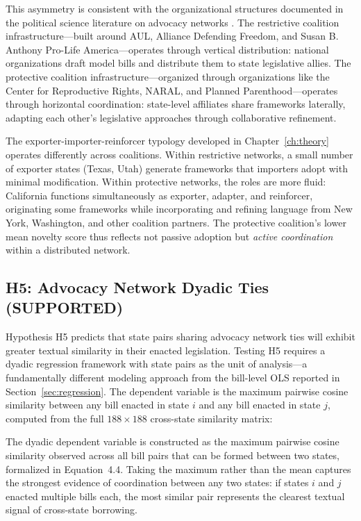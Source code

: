 This asymmetry is consistent with the organizational structures documented in the political science literature on advocacy networks \parencite{hertel-fernandezStateCapture2019}. The restrictive coalition infrastructure---built around AUL, Alliance Defending Freedom, and Susan B. Anthony Pro-Life America---operates through vertical distribution: national organizations draft model bills and distribute them to state legislative allies. The protective coalition infrastructure---organized through organizations like the Center for Reproductive Rights, NARAL, and Planned Parenthood---operates through horizontal coordination: state-level affiliates share frameworks laterally, adapting each other's legislative approaches through collaborative refinement.

The exporter-importer-reinforcer typology developed in Chapter~\ref{ch:theory} operates differently across coalitions. Within restrictive networks, a small number of exporter states (Texas, Utah) generate frameworks that importers adopt with minimal modification. Within protective networks, the roles are more fluid: California functions simultaneously as exporter, adapter, and reinforcer, originating some frameworks while incorporating and refining language from New York, Washington, and other coalition partners. The protective coalition's lower mean novelty score thus reflects not passive adoption but \textit{active coordination} within a distributed network.

\subsection{H5: Advocacy Network Dyadic Ties (SUPPORTED)}
\label{sec:h5}

Hypothesis H5 predicts that state pairs sharing advocacy network ties will exhibit greater textual similarity in their enacted legislation. Testing H5 requires a dyadic regression framework with state pairs as the unit of analysis---a fundamentally different modeling approach from the bill-level OLS reported in Section~\ref{sec:regression}. The dependent variable is the maximum pairwise cosine similarity between any bill enacted in state $i$ and any bill enacted in state $j$, computed from the full $188 \times 188$ cross-state similarity matrix:

The dyadic dependent variable is constructed as the maximum pairwise cosine similarity observed across all bill pairs that can be formed between two states, formalized in Equation~4.4. Taking the maximum rather than the mean captures the strongest evidence of coordination between any two states: if states $i$ and $j$ enacted multiple bills each, the most similar pair represents the clearest textual signal of cross-state borrowing.

